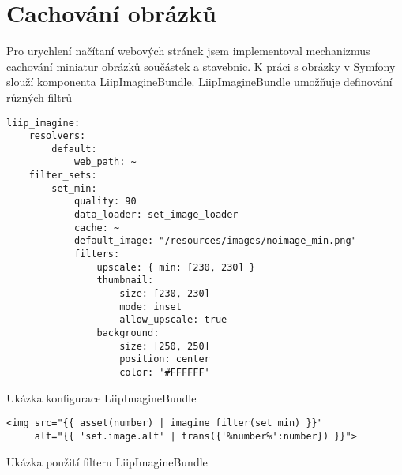 \section{Cachování obrázků}
Pro urychlení načítaní webových stránek jsem implementoval mechanizmus cachování miniatur obrázků součástek a stavebnic. K práci s obrázky v Symfony slouží komponenta LiipImagineBundle. LiipImagineBundle umožňuje definování různých filtrů 

\begin{listing}[htbp]
  \begin{verbatim}
liip_imagine:
    resolvers:
        default:
            web_path: ~
    filter_sets:
        set_min:
            quality: 90
            data_loader: set_image_loader
            cache: ~
            default_image: "/resources/images/noimage_min.png"
            filters:
                upscale: { min: [230, 230] }
                thumbnail:
                    size: [230, 230] 
                    mode: inset
                    allow_upscale: true 
                background: 
                    size: [250, 250]
                    position: center
                    color: '#FFFFFF'
  \end{verbatim}
  \caption{Ukázka konfigurace LiipImagineBundle\label{liip-imagine-config}}
\end{listing}

\begin{listing}[htbp]
  \begin{verbatim}
<img src="{{ asset(number) | imagine_filter(set_min) }}" 
     alt="{{ 'set.image.alt' | trans({'%number%':number}) }}">
    \end{verbatim}
  \caption{Ukázka použití filteru LiipImagineBundle\label{liip-imagine-usage}}
\end{listing}   
